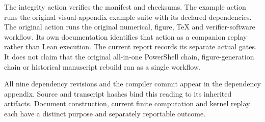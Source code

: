 The integrity action verifies the manifest and checksums. The example action runs the original visual-appendix example suite with its declared dependencies. The original action runs the original numerical, figure, TeX and verifier-software workflow. Its own documentation identifies that action as a companion replay rather than Lean execution. The current report records its separate actual gates. It does not claim that the original all-in-one PowerShell chain, figure-generation chain or historical manuscript rebuild ran as a single workflow.

All nine dependency revisions and the compiler commit appear in the dependency appendix. Source and transcript hashes bind this reading to its inherited artifacts. Document construction, current finite computation and kernel replay each have a distinct purpose and separately reportable outcome.
